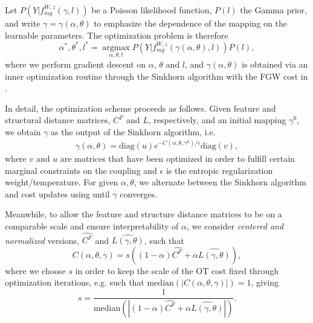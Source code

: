 \documentclass{article}
\begin{document}
Let $P(Y|f^{W,z}_{mg}(\gamma, l))$ be a Poisson likelihood function, $P(l)$ the Gamma prior, and write $\gamma=\gamma(\alpha, \theta)$ to emphasize the dependence of the mapping on the learnable parameters. The optimization problem is therefore
\begin{equation}
\label{eq:data_objective}
    \alpha^*, \theta^*, l^* = \operatorname*{argmax}_{\alpha, \theta, l} P(Y|f^{W,z}_{mg}(\gamma(\alpha, \theta), l)) P(l),
\end{equation}
where we perform gradient descent on $\alpha$, $\theta$ and $l$, and $\gamma(\alpha, \theta)$ is obtained via an inner optimization routine through the Sinkhorn algorithm with the FGW cost in .

In detail, the optimization scheme proceeds as follows. Given feature and structural distance matrices, $C^F$ and $L$, respectively, and an initial mapping $\gamma^0$, we obtain $\gamma$ as the output of the Sinkhorn algorithm, i.e.
\begin{gather}
    \gamma(\alpha, \theta) = \text{diag}(u) e^{-C(\alpha, \theta, \gamma^0) / \epsilon}\text{diag}(v),
\end{gather}
where $v$ and $u$ are matrices that have been optimized in order to fulfill certain marginal constraints on the coupling and $\epsilon$ is the entropic regularization weight/temperature. For given $\alpha, \theta$, we alternate between the Sinkhorn algorithm and cost updates using  until $\gamma$ converges.

Meanwhile, to allow the feature and structure distance matrices to be on a comparable scale and ensure interpretability of $\alpha$, we consider \textit{centered and normalized} versions, $\widehat{C^F}$ and $\widehat{L(\gamma,\theta)}$, such that
\begin{equation}
    C(\alpha, \theta, \gamma) = s\left((1-\alpha)\widehat{C^F} + \alpha \widehat{L(\gamma,\theta)} \right),
\end{equation}
where we choose $s$ in order to keep the scale of the OT cost fixed through optimization iterations, e.g. such that $\text{median}\left(\left|C(\alpha, \theta, \gamma)\right|\right) = 1$, giving
\begin{equation}
\label{eq:s}
    s = \frac{1}{\text{median}\left(\left|(1-\alpha)\widehat{C^F} + \alpha \widehat{L(\gamma,\theta)}\right|\right)}.
\end{equation}
\end{document}

